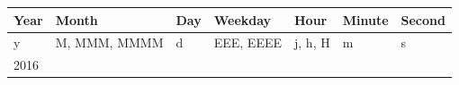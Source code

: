 \documentclass[12pt,]{article}
\begin{document}
\begin{longtable}[c]{@{}lllllll@{}}
\toprule
\begin{minipage}[b]{0.07\columnwidth}\raggedright\strut
Year
\strut\end{minipage} &
\begin{minipage}[b]{0.19\columnwidth}\raggedright\strut
Month
\strut\end{minipage} &
\begin{minipage}[b]{0.06\columnwidth}\raggedright\strut
Day
\strut\end{minipage} &
\begin{minipage}[b]{0.15\columnwidth}\raggedright\strut
Weekday
\strut\end{minipage} &
\begin{minipage}[b]{0.14\columnwidth}\raggedright\strut
Hour
\strut\end{minipage} &
\begin{minipage}[b]{0.10\columnwidth}\raggedright\strut
Minute
\strut\end{minipage} &
\begin{minipage}[b]{0.10\columnwidth}\raggedright\strut
Second
\strut\end{minipage}\tabularnewline
\midrule
\endhead
\begin{minipage}[t]{0.07\columnwidth}\raggedright\strut
y
\strut\end{minipage} &
\begin{minipage}[t]{0.19\columnwidth}\raggedright\strut
M, MMM, MMMM
\strut\end{minipage} &
\begin{minipage}[t]{0.06\columnwidth}\raggedright\strut
d
\strut\end{minipage} &
\begin{minipage}[t]{0.15\columnwidth}\raggedright\strut
EEE, EEEE
\strut\end{minipage} &
\begin{minipage}[t]{0.14\columnwidth}\raggedright\strut
j, h, H
\strut\end{minipage} &
\begin{minipage}[t]{0.10\columnwidth}\raggedright\strut
m
\strut\end{minipage} &
\begin{minipage}[t]{0.10\columnwidth}\raggedright\strut
s
\strut\end{minipage}\tabularnewline
\begin{minipage}[t]{0.07\columnwidth}\raggedright\strut
2016
\strut\end{minipage} &

\end{longtable}
\end{document}
